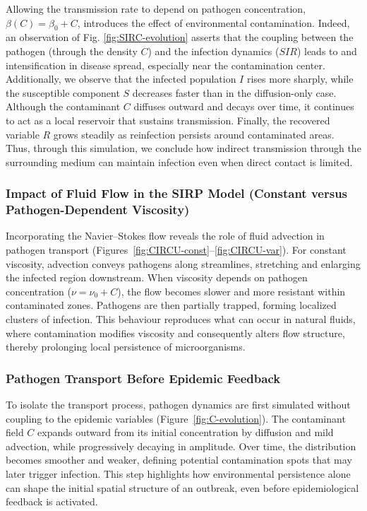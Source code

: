 \documentclass[10pt,number,preprint,times]{elsarticle}
\numberwithin{equation}{section} %
\begin{document}
Allowing the transmission rate to depend on pathogen concentration, $\beta(C)=\beta_0+C$, introduces the effect of environmental contamination. Indeed, an observation of Fig. \ref{fig:SIRC-evolution} asserts that the coupling between the pathogen (through the density $C$) and the infection dynamics ($SIR$) leads to and intensification in disease spread, especially near the contamination center. Additionally, we observe that the infected population $I$ rises more sharply, while the susceptible component $S$ decreases faster than in the diffusion-only case. Although the contaminant $C$ diffuses outward and decays over time, it continues to act as a local reservoir that sustains transmission. Finally, the recovered variable $R$ grows steadily as reinfection persists around contaminated areas. Thus, through this simulation, we conclude  how indirect transmission through the surrounding medium can maintain infection even when direct contact is limited.


\subsubsection{Impact of Fluid Flow in the SIRP Model (Constant versus Pathogen-Dependent Viscosity)}

Incorporating the Navier–Stokes flow reveals the role of fluid advection in pathogen transport (Figures~\ref{fig:CIRCU-const}–\ref{fig:CIRCU-var}). For constant viscosity, advection conveys pathogens along streamlines, stretching and enlarging the infected region downstream. When viscosity depends on pathogen concentration ($\nu=\nu_0+C$), the flow becomes slower and more resistant within contaminated zones. Pathogens are then partially trapped, forming localized clusters of infection. This behaviour reproduces what can occur in natural fluids, where contamination modifies viscosity and consequently alters flow structure, thereby prolonging local persistence of microorganisms.


\subsubsection{Pathogen Transport Before Epidemic Feedback}

To isolate the transport process, pathogen dynamics are first simulated without coupling to the epidemic variables (Figure~\ref{fig:C-evolution}). The contaminant field $C$ expands outward from its initial concentration by diffusion and mild advection, while progressively decaying in amplitude. Over time, the distribution becomes smoother and weaker, defining potential contamination spots that may later trigger infection. This step highlights how environmental persistence alone can shape the initial spatial structure of an outbreak, even before epidemiological feedback is activated.
\end{document}
